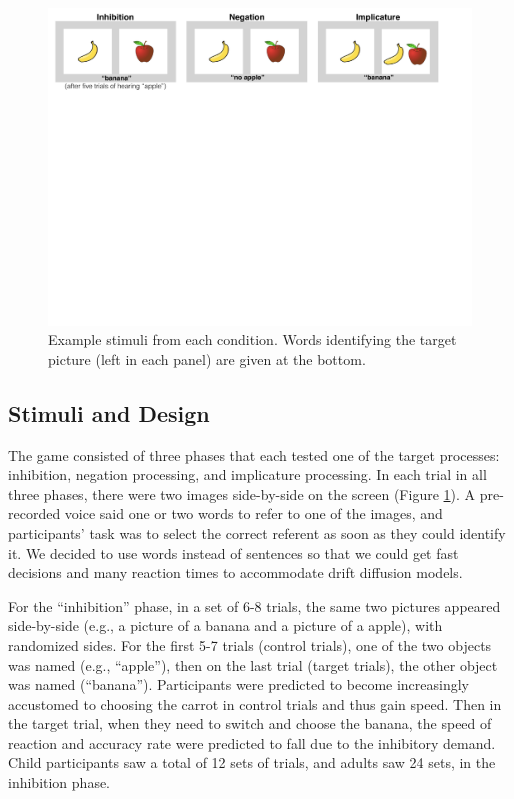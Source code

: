 \documentclass[10pt,letterpaper]{article}
\begin{document}
\begin{figure}[t]
\begin{centering}
\includegraphics[width=\textwidth]{figures/stimuli.pdf}
\caption{\label{fig:stimuli} Example stimuli from each condition. Words identifying the target picture (left in each panel) are given at the bottom.}
\end{centering}
\end{figure}

\subsection{Stimuli and Design}

The game consisted of three phases that each tested one of the target processes: inhibition, negation processing, and implicature processing.  In each trial in all three phases, there were two images side-by-side on the screen (Figure \ref{fig:stimuli}). A pre-recorded voice said one or two words to refer to one of the images, and participants' task was to select the correct referent as soon as they could identify it. We decided to use words instead of sentences so that we could get fast decisions and many reaction times to accommodate drift diffusion models. 

For the ``inhibition'' phase, in a set of 6-8 trials, the same two pictures appeared side-by-side (e.g., a picture of a banana and a picture of a apple), with randomized sides. For the first 5-7 trials (control trials), one of the two objects was named (e.g., ``apple''), then on the last trial  (target trials), the other object was named (``banana''). Participants were predicted to become increasingly accustomed to choosing the carrot in control trials and thus gain speed. Then in the target trial, when they need to switch and choose the banana, the speed of reaction and accuracy rate were predicted to fall due to the inhibitory demand. Child participants saw a total of 12 sets of trials, and adults saw 24 sets, in the inhibition phase.
\end{document}

